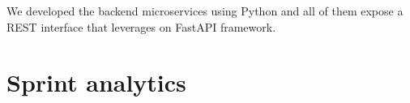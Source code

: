 \documentclass[11pt, a4paper]{article}
\begin{document}
We developed the backend microservices using Python and all of them expose a REST interface that leverages on FastAPI framework. 


\newpage

\section{Sprint analytics}
\end{document}
